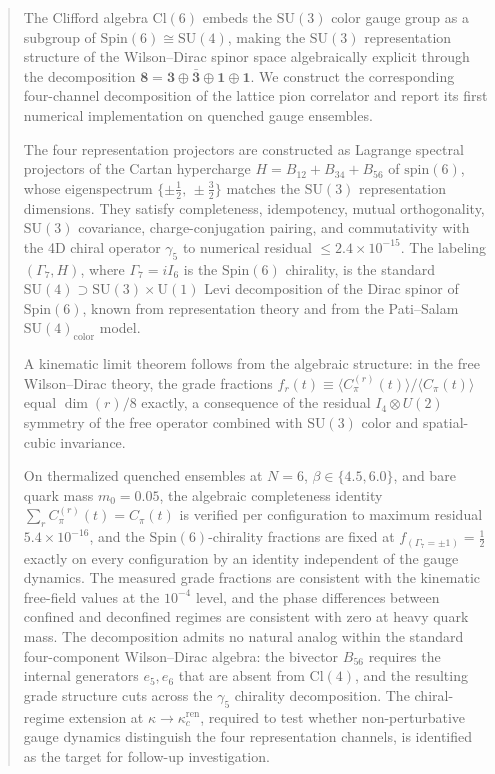 \documentclass[12pt]{article}
\theoremstyle{definition}
\theoremstyle{remark}
\newcommand{\cl}{\mathrm{Cl}}           %
\newcommand{\spin}{\mathrm{Spin}}       %
\newcommand{\su}{\mathrm{SU}}           %
\newcommand{\kcren}{\kappa_{c}^{\mathrm{ren}}}      %
\newcommand{\GaSeven}{\Gamma_7}                      %
\newcommand{\Isix}{I_6}                              %
\begin{document}
	\begin{abstract}
		The Clifford algebra $\cl(6)$ embeds the $\su(3)$ color gauge group as a
		subgroup of $\spin(6)\cong\su(4)$, making the $\su(3)$ representation
		structure of the Wilson--Dirac spinor space algebraically explicit through
		the decomposition
		$\mathbf{8} = \mathbf{3}\oplus\bar{\mathbf{3}}\oplus\mathbf{1}\oplus\mathbf{1}$.
		We construct the corresponding four-channel decomposition of the lattice
		pion correlator and report its first numerical implementation on quenched
		gauge ensembles.
		
		The four representation projectors are constructed as Lagrange spectral
		projectors of the Cartan hypercharge $H = B_{12}+B_{34}+B_{56}$ of
		$\mathrm{spin}(6)$, whose eigenspectrum
		$\{\pm\tfrac{1}{2},\,\pm\tfrac{3}{2}\}$ matches the $\su(3)$
		representation dimensions.  They satisfy completeness, idempotency,
		mutual orthogonality, $\su(3)$ covariance, charge-conjugation pairing, and
		commutativity with the 4D chiral operator $\gamma_5$ to numerical residual
		$\leq 2.4\times 10^{-15}$.  The labeling $(\GaSeven, H)$, where
		$\GaSeven = i\Isix$ is the $\spin(6)$ chirality, is the standard
		$\su(4)\supset\su(3)\times\mathrm{U}(1)$ Levi decomposition of the Dirac
		spinor of $\spin(6)$, known from representation theory and from the
		Pati--Salam $\su(4)_{\mathrm{color}}$ model.
		
		A kinematic limit theorem follows from the algebraic structure: in the
		free Wilson--Dirac theory, the grade fractions
		$f_r(t)\equiv\langle C_\pi^{(r)}(t)\rangle/\langle C_\pi(t)\rangle$
		equal $\dim(r)/8$ exactly, a consequence of
		the residual $I_4{\otimes}U(2)$ symmetry of the free operator combined
		with $\su(3)$ color and spatial-cubic invariance.
		
		On thermalized quenched ensembles at $N=6$, $\beta\in\{4.5,6.0\}$, and
		bare quark mass $m_0=0.05$, the algebraic completeness identity
		$\sum_r C_\pi^{(r)}(t)=C_\pi(t)$ is verified per configuration to
		maximum residual $5.4\times 10^{-16}$, and the $\spin(6)$-chirality fractions
		are fixed at $f_{(\GaSeven=\pm1)}=\tfrac12$ exactly on every configuration by
		an identity independent of the gauge dynamics.  The measured grade fractions are
		consistent with the kinematic free-field values at the $10^{-4}$ level,
		and the phase differences between confined and deconfined regimes are
		consistent with zero at heavy quark mass.  The decomposition admits no
		natural analog within the standard four-component Wilson--Dirac algebra:
		the bivector $B_{56}$ requires the internal generators $e_5,e_6$ that
		are absent from $\cl(4)$, and the resulting grade structure cuts across
		the $\gamma_5$ chirality decomposition.  The chiral-regime extension at
		$\kappa\to\kcren$, required to test whether non-perturbative gauge
		dynamics distinguish the four representation channels, is identified as
		the target for follow-up investigation.
	\end{abstract}
	
\end{document}
